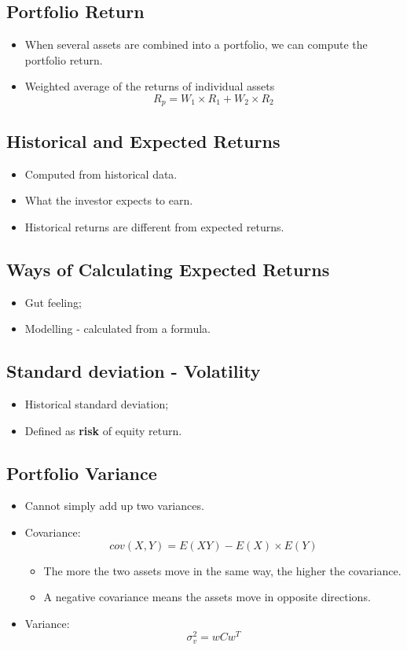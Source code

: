 \documentclass[11pt,a4paper]{report}
\begin{document}
\subsection{Portfolio Return}
\begin{itemize}
    \item When several assets are combined into a portfolio, we can compute the portfolio return.
    \item Weighted average of the returns of individual assets
    \[ R_p = W_1 \times R_1 + W_2 \times R_2\]
\end{itemize}

\subsection{Historical and Expected Returns}
\begin{itemize}
    \item Computed from historical data.
    \item What the investor expects to earn.
    \item Historical returns are different from expected returns.
\end{itemize}

\subsection{Ways of Calculating Expected Returns}
\begin{itemize}
    \item Gut feeling;
    \item Modelling - calculated from a formula.
\end{itemize}

\subsection{Standard deviation - Volatility}
\begin{itemize}
    \item Historical standard deviation;
    \item Defined as \textbf{risk} of equity return.
\end{itemize}

\subsection{Portfolio Variance}
\begin{itemize}
    \item Cannot simply add up two variances.
    \item Covariance:
    \[cov(X,Y) = E(XY) - E(X) \times E(Y)\]
    \begin{itemize}
        \item The more the two assets move in the same way, the higher the covariance.
        \item A negative covariance means the assets move in opposite directions.
    \end{itemize}
    \item Variance:
    \[ \sigma_v^2 = wCw^T \]
\end{itemize}
\end{document}
